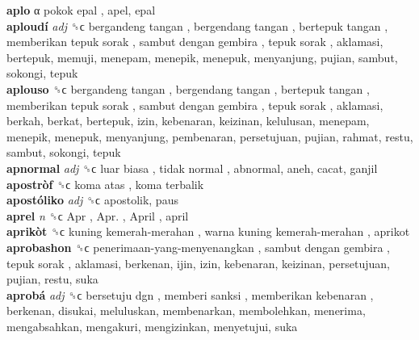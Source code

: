 \textbf{aplo} α   pokok epal , apel, epal  \\
\textbf{aploudí} \emph{adj}  ␝ϲ   bergandeng tangan ,  bergendang tangan ,  bertepuk tangan ,  memberikan tepuk sorak ,  sambut dengan gembira ,  tepuk sorak , aklamasi, bertepuk, memuji, menepam, menepik, menepuk, menyanjung, pujian, sambut, sokongi, tepuk  \\
\textbf{aplouso} ␝ϲ   bergandeng tangan ,  bergendang tangan ,  bertepuk tangan ,  memberikan tepuk sorak ,  sambut dengan gembira ,  tepuk sorak , aklamasi, berkah, berkat, bertepuk, izin, kebenaran, keizinan, kelulusan, menepam, menepik, menepuk, menyanjung, pembenaran, persetujuan, pujian, rahmat, restu, sambut, sokongi, tepuk  \\
\textbf{apnormal} \emph{adj}  ␝ϲ   luar biasa ,  tidak normal , abnormal, aneh, cacat, ganjil  \\
\textbf{apostròf} ␝ϲ   koma atas ,  koma terbalik   \\
\textbf{apostóliko} \emph{adj}  ␝ϲ  apostolik, paus  \\
\textbf{aprel} \emph{n}  ␝ϲ   Apr ,  Apr. ,  April , april  \\
\textbf{aprikòt} ␝ϲ   kuning kemerah-merahan ,  warna kuning kemerah-merahan , aprikot  \\
\textbf{aprobashon} ␝ϲ   penerimaan-yang-menyenangkan ,  sambut dengan gembira ,  tepuk sorak , aklamasi, berkenan, ijin, izin, kebenaran, keizinan, persetujuan, pujian, restu, suka  \\
\textbf{aprobá} \emph{adj}  ␝ϲ   bersetuju dgn ,  memberi sanksi ,  memberikan kebenaran , berkenan, disukai, meluluskan, membenarkan, membolehkan, menerima, mengabsahkan, mengakuri, mengizinkan, menyetujui, suka  \\
